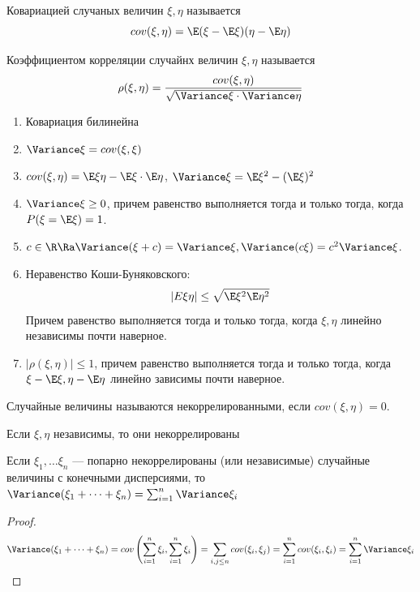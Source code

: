\begin{definition}
    Ковариацией случаных величин \(\xi, \eta\) называется
    \[cov(\xi, \eta) = \E(\xi - \E\xi)(\eta - \E\eta)\]
\end{definition}

\begin{definition}
    Коэффициентом корреляции случайнх величин \(\xi, \eta\) называется
    \[\rho(\xi, \eta) = \frac{cov(\xi, \eta)}{\sqrt{\Variance \xi \cdot \Variance \eta}}\]
\end{definition}

\begin{lemma}
    \begin{enumerate}
        \item Ковариация билинейна
        \item \(\Variance \xi = cov(\xi, \xi)\)
        \item \(cov(\xi, \eta) = \E\xi\eta - \E\xi\cdot \E\eta\), \(\Variance \xi = \E\xi^2 - (\E\xi)^2\)
        \item \(\Variance \xi \ge 0\), причем равенство выполняется тогда и только тогда, когда \(P(\xi = \E\xi) = 1\).
        \item \(c \in \R \Ra \Variance(\xi + c) = \Variance \xi, \Variance(c\xi) = c^2\Variance \xi\).
        \item Неравенство Коши-Буняковского:
        \[|E\xi\eta| \le \sqrt{\E\xi^2 \E\eta^2}\]
        Причем равенство выполняется тогда и только тогда, когда \(\xi, \eta\) линейно независимы почти наверное.
        \item \(|\rho(\xi, \eta)| \le 1\), причем равенство выполняется тогда и только тогда, когда \(\xi - \E\xi, \eta - \E\eta\) линейно зависимы почти наверное.
    \end{enumerate}
\end{lemma}

\begin{definition}
    Случайные величины называются некоррелированными, если \(cov(\xi, \eta) = 0\).
\end{definition}

\begin{corollary}
    Если \(\xi, \eta\) независимы, то они некоррелированы
\end{corollary}

\begin{corollary}
    Если \(\xi_1, \dots \xi_n\) --- попарно некоррелированы (или независимые) случайные величины с конечными дисперсиями, то \(\Variance(\xi_1 + \dots + \xi_n) = \sum_{i = 1}^n \Variance \xi_i\)
\end{corollary}
\begin{proof}
    \[\Variance(\xi_1 + \dots + \xi_n) = cov\left( \sum_{i = 1}^n \xi_i, \sum_{i = 1}^n \xi_i \right) = \sum_{i, j \le n} cov(\xi_i, \xi_j) = \sum_{i = 1}^n cov(\xi_i, \xi_i) = \sum_{i = 1}^n \Variance \xi_i\]
\end{proof}


